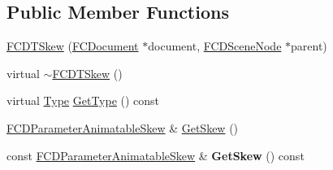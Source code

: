 \subsection*{Public Member Functions}
\begin{DoxyCompactItemize}
\item 
\hyperlink{classFCDTSkew_a2aba1a042d54f8a10b304e9b566dcc70}{FCDTSkew} (\hyperlink{classFCDocument}{FCDocument} $\ast$document, \hyperlink{classFCDSceneNode}{FCDSceneNode} $\ast$parent)
\item 
virtual \hyperlink{classFCDTSkew_a92bfc908793e289b13586e792210f841}{$\sim$FCDTSkew} ()
\item 
virtual \hyperlink{classFCDTransform_a13e561c5e53aeaf84dedf4661cdc8921}{Type} \hyperlink{classFCDTSkew_a069afb12195014737cc891cf4edd0946}{GetType} () const 
\item 
\hyperlink{classFCDParameterAnimatableT}{FCDParameterAnimatableSkew} \& \hyperlink{classFCDTSkew_a9431366cb29146c6947c63dbeb9fe2b6}{GetSkew} ()
\item 
\hypertarget{classFCDTSkew_a12c760e6bd411edcae0987118a53cd76}{
const \hyperlink{classFCDParameterAnimatableT}{FCDParameterAnimatableSkew} \& {\bfseries GetSkew} () const }
\label{classFCDTSkew_a12c760e6bd411edcae0987118a53cd76}


\end{DoxyCompactItemize}
